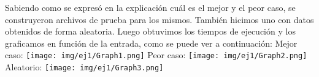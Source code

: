 Sabiendo como se expresó en la explicación cuál es el mejor y el peor caso, se construyeron archivos de prueba para los mismos. También hicimos uno con datos obtenidos de forma aleatoria. Luego obtuvimos los tiempos de ejecución y los graficamos en función de la entrada, como se puede ver a continuación:
\newline
Mejor caso:
\newline
\texttt{[image: img/ej1/Graph1.png]}
\newline
Peor caso:
\texttt{[image: img/ej1/Graph2.png]}
\newline
Aleatorio:
\texttt{[image: img/ej1/Graph3.png]}
\newline
